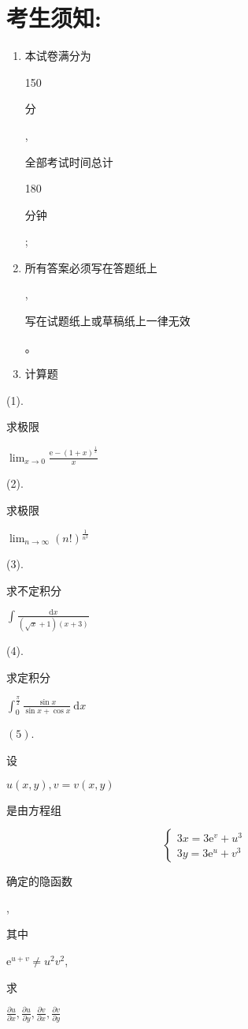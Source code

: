 \documentclass[10pt]{article}
\begin{document}
\section{考生须知:}
\begin{enumerate}
  \item \begin{CJK}{UTF8}{mj}本试卷满分为\end{CJK} 150 \begin{CJK}{UTF8}{mj}分\end{CJK}, \begin{CJK}{UTF8}{mj}全部考试时间总计\end{CJK} 180 \begin{CJK}{UTF8}{mj}分钟\end{CJK};

  \item \begin{CJK}{UTF8}{mj}所有答案必须写在答题纸上\end{CJK}, \begin{CJK}{UTF8}{mj}写在试题纸上或草稿纸上一律无效\end{CJK}。

  \item \begin{CJK}{UTF8}{mj}计算题\end{CJK}

\end{enumerate}
(1). \begin{CJK}{UTF8}{mj}求极限\end{CJK} $\lim _{x \rightarrow 0} \frac{\mathrm{e}-(1+x)^{\frac{1}{x}}}{x}$

(2). \begin{CJK}{UTF8}{mj}求极限\end{CJK} $\lim _{n \rightarrow \infty}(n !)^{\frac{1}{n^{2}}}$

(3). \begin{CJK}{UTF8}{mj}求不定积分\end{CJK} $\int \frac{\mathrm{d} x}{(\sqrt{x}+1)(x+3)}$

(4). \begin{CJK}{UTF8}{mj}求定积分\end{CJK} $\int_{0}^{\frac{\pi}{2}} \frac{\sin x}{\sin x+\cos x} \mathrm{~d} x$

$(5)$. \begin{CJK}{UTF8}{mj}设\end{CJK} $u(x, y), v=v(x, y)$ \begin{CJK}{UTF8}{mj}是由方程组\end{CJK}
$$
\left\{\begin{array}{l}
3 x=3 \mathrm{e}^{v}+u^{3} \\
3 y=3 \mathrm{e}^{u}+v^{3}
\end{array}\right.
$$
\begin{CJK}{UTF8}{mj}确定的隐函数\end{CJK}, \begin{CJK}{UTF8}{mj}其中\end{CJK} $\mathrm{e}^{u+v} \neq u^{2} v^{2}$, \begin{CJK}{UTF8}{mj}求\end{CJK} $\frac{\partial u}{\partial x}, \frac{\partial u}{\partial y}, \frac{\partial v}{\partial x}, \frac{\partial v}{\partial y}$
\end{document}
